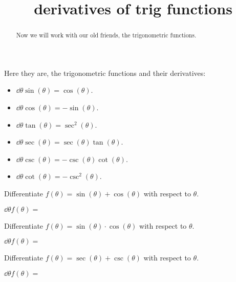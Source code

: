 \documentclass{ximera}
\title{derivatives of trig functions}
\begin{document}
\begin{abstract}
  Now we will work with our old friends, the trigonometric functions. 
\end{abstract}
\maketitle

Here they are, the trigonometric functions and their derivatives:


\begin{theorem} \hfil
\begin{itemize}
\item $\dd{\theta} \sin(\theta) = \cos(\theta)$.
\item $\dd{\theta} \cos(\theta) = -\sin(\theta)$.
\item $\dd{\theta} \tan(\theta) = \sec^2(\theta)$.
\item $\dd{\theta} \sec(\theta) = \sec(\theta)\tan(\theta)$.
\item $\dd{\theta} \csc(\theta) = -\csc(\theta)\cot(\theta)$.
\item $\dd{\theta} \cot(\theta) = -\csc^2(\theta)$.
\end{itemize}
\end{theorem}


\begin{question}
  Differentiate $f(\theta) = \sin(\theta) + \cos(\theta)$ with respect to $\theta$.
  \begin{prompt}
    $\dd{\theta} f(\theta) = $\answer{$\cos(\theta)-\sin(\theta)$}
  \end{prompt}
\end{question}

\begin{question}
  Differentiate $f(\theta) = \sin(\theta)\cdot\cos(\theta)$ with respect to $\theta$.
  \begin{prompt}
    $\dd{\theta} f(\theta) = $
  \end{prompt}
\end{question}


\begin{question}
  Differentiate $f(\theta) = \sec(\theta) + \csc(\theta)$ with respect to $\theta$.
  \begin{prompt}
    $\dd{\theta} f(\theta) = $\answer{$\sec(\theta)*\tan(\theta) - \cot(\theta)*\csc(\theta)$}
  \end{prompt}
\end{question}
\end{document}
